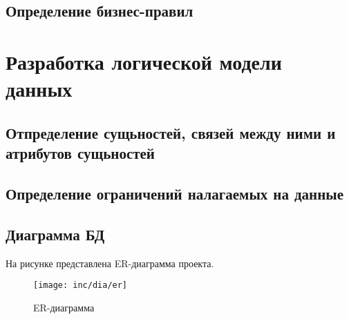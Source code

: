\subsection{Определение бизнес-правил}

\section{Разработка логической модели данных}

\subsection{Отпределение сущьностей, связей между ними и атрибутов сущьностей}

\subsection{Определение ограничений налагаемых на данные}


\subsection{Диаграмма БД}
На рисунке \cite{fig:er} представлена ER-диаграмма проекта.
\begin{figure}
  \centering
  \texttt{[image: inc/dia/er]}
  \caption{ER-диаграмма}
  \label{fig:er}
\end{figure}
\cite{cha:analysis}





